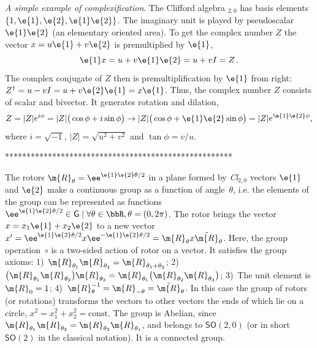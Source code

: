 \vspace{5mm}
\noindent \textit{A simple example of
complexification}.  The Clifford algebra $_{2,0}$ has
basis elements $\{1,\e{1},\e{2},\e{1}\e{2}\}$. The imaginary unit
is played by pseudoscalar $\e{1}\e{2}$ (an elementary oriented
area). To get the complex number $Z$ the vector $x=u\e{1}+v\e{2}$
is premultiplied by $\e{1}$,
\begin{equation*}
\e{1}x=u+v\e{1}\e{2}=u+vI=Z\, .
\end{equation*}
The complex conjugate of $Z$ then is premultiplification by
$\e{1}$ from right: $Z^{\dagger}=u-vI=u+v\e{2}\e{1}=x\e{1}$. Thus,
the complex number  $Z$ consists of scalar and bivector. It
generates rotation and dilation,
\begin{equation*}
Z=|Z| e^{i\phi}=|Z|\big(\cos\phi+i\sin\phi\big)\rightarrow
|Z|\big(\cos\phi+\e{1}\e{2}\sin\phi\big)=|Z|e^{\e{1}\e{2}\phi},
\end{equation*}
where $i=\sqrt{-1}$,  $|Z|=\sqrt{u^2+v^2}$ and $\tan\phi=v/u$.


*****************************************************

%
\begin{example}
The rotors $\m{R}_{\theta}=\ee^{\e{1}\e{2}\theta/2}$ in a plane
formed by \textit{Cl}$_{2,0}$ vectors $\e{1}$ and $\e{2}$  make a
continuous group as a function of angle~$\theta$, i.e. the
elements of the group can be represented as functions
$\ee^{\e{1}\e{2}\theta/2}\in\mathsf{G}
\;|\;\forall\theta\in\bbR, \theta=(0,2\pi)$. The rotor
brings the vector $x=x_1\e{1}+x_2\e{2}$ to a new vector
$x^{\prime}=\ee^{\e{1}\e{2}\theta/2}x\ee^{-\e{1}\e{2}\theta/2}=\m{R}_{\theta}x\tilde{\m{R}}_{\theta}$.
Here, the group operation~$\circ$ is a two-sided action of rotor
on a vector. It satisfies the group axioms:
1)~$\m{R}_{\theta_1}\m{R}_{\theta_2}=\m{R}_{\theta_1+\theta_2}$;
2)~$\big(\m{R}_{\theta_1}\m{R}_{\theta_2}\big)\m{R}_{\theta_3}=\m{R}_{\theta_1}\big(\m{R}_{\theta_2}\m{R}_{\theta_3}\big)$;
3)~The unit element is $\m{R}_{0}=1$;
4)~$\m{R}_{\theta}^{-1}=\m{R}_{-\theta}=\tilde{\m{R}}_{\theta}$.
In this case the group of rotors (or  rotations)  transforms the
vectors to other vectors the ends of which lie on a circle,
$x^2=x_1^2+x_2^2=\mathrm{const}$. The group  is Abelian, since
$\m{R}_{\theta_1}\m{R}_{\theta_2}=\m{R}_{\theta_2}\m{R}_{\theta_1}$,
and belongs to $\mathsf{SO}(2,0)$ (or in short $\mathsf{SO}(2)$ in
the classical notation).  It is a connected group.
\end{example}

